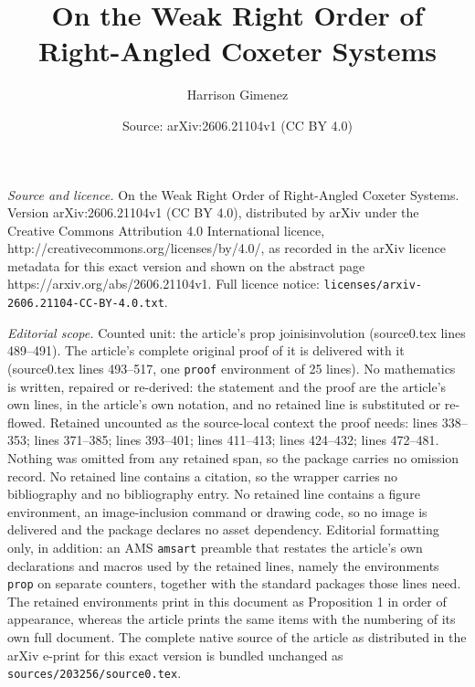 \documentclass[10pt,a4paper]{amsart}
\title{On the Weak Right Order of Right-Angled Coxeter Systems}
\author{Harrison Gimenez}
\date{Source: arXiv:2606.21104v1 (CC BY 4.0)}
\begin{document}
\maketitle

\noindent\emph{Source and licence.} On the Weak Right Order of Right-Angled Coxeter Systems. Version arXiv:2606.21104v1 (CC BY 4.0), distributed by arXiv under the Creative Commons Attribution 4.0 International licence, http://creativecommons.org/licenses/by/4.0/, as recorded in the arXiv licence metadata for this exact version and shown on the abstract page https://arxiv.org/abs/2606.21104v1. Full licence notice: \texttt{licenses/arxiv-2606.21104-CC-BY-4.0.txt}.\par\smallskip

\noindent\textit{Editorial scope.} Counted unit: the article's prop joinisinvolution (source0.tex lines 489--491). The article's complete original proof of it is delivered with it (source0.tex lines 493--517, one \texttt{proof} environment of 25 lines). No mathematics is written, repaired or re-derived: the statement and the proof are the article's own lines, in the article's own notation, and no retained line is substituted or re-flowed.  Retained uncounted as the source-local context the proof needs: lines 338--353; lines 371--385; lines 393--401; lines 411--413; lines 424--432; lines 472--481.  Nothing was omitted from any retained span, so the package carries no omission record.  No retained line contains a citation, so the wrapper carries no bibliography and no bibliography entry.  No retained line contains a figure environment, an image-inclusion command or drawing code, so no image is delivered and the package declares no asset dependency.  Editorial formatting only, in addition: an AMS \texttt{amsart} preamble that restates the article's own declarations and macros used by the retained lines, namely the environments \texttt{prop} on separate counters, together with the standard packages those lines need.  The retained environments print in this document as Proposition 1 in order of appearance, whereas the article prints the same items with the numbering of its own full document.  The complete native source of the article as distributed in the arXiv e-print for this exact version is bundled unchanged as \texttt{sources/203256/source0.tex}.
\end{document}

